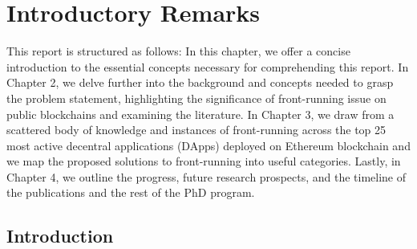 







\chapter{Introductory Remarks} \label{sec:intro}




This report is structured as follows: In this chapter, we offer a concise introduction to the essential concepts necessary for comprehending this report. In Chapter 2, we delve further into the background and concepts needed to grasp the problem statement, highlighting the significance of front-running issue on public blockchains and examining the literature. In Chapter 3, we draw from a scattered body of knowledge and instances of front-running across the top 25 most active decentral applications (DApps) deployed on Ethereum blockchain and we map the proposed solutions to front-running into useful categories. Lastly, in Chapter 4, we outline the progress, future research prospects, and the timeline of the publications and the rest of the PhD program.




\section{Introduction} \label{sec:intro}

